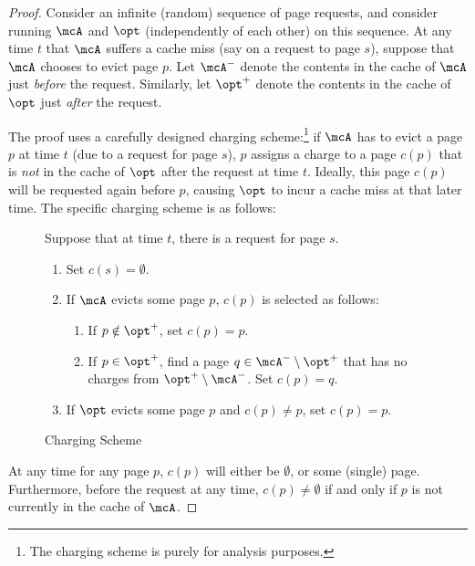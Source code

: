 \begin{proof}
    Consider an infinite (random) sequence of page requests, and consider running $\mcA$ and $\opt$ (independently of each other) on this sequence. At any time $t$ that $\mcA$ suffers a cache miss (say on a request to page $s$), suppose that $\mcA$ chooses to evict page $p$. Let $\mcA^-$ denote the contents in the cache of $\mcA$ just \textit{before} the request. Similarly, let $\opt^+$ denote the contents in the cache of $\opt$ just \textit{after} the request.
    
The proof uses a carefully designed charging scheme:\footnote{The charging scheme is purely for analysis purposes.} if $\mcA$ has to evict a page $p$ at time $t$ (due to a request for page $s$), $p$ assigns a charge to a page $c(p)$ that is \textit{not} in the cache of $\opt$ after the request at time $t$. Ideally, this page $c(p)$ will be requested again before $p$, causing $\opt$ to incur a cache miss at that later time. The specific charging scheme is as follows:
    \begin{figure}[H]
        \begin{framed}
        Suppose that at time $t$, there is a request for page $s$.
            \vspace{-2mm}
                \begin{enumerate}
                    \item \label{item:clear-charges} Set $c(s)=\emptyset$.
                    \item \label{item:assign-charge} If $\mcA$ evicts some page $p$, $c(p)$ is selected as follows:
                    \begin{enumerate}
                        \item \label{item:p-not-in-opt+} If $p \notin \opt^+$, set $c(p)=p$.
                        \item \label{item:p-in-opt+} If $p \in \opt^+$, find a page $q \in \mcA^- \setminus \opt^+$ that has no charges from $\opt^+ \setminus \mcA^-$. Set $c(p)=q$.\footnotemark
                    \end{enumerate}
                    \item \label{item:opt-eviction-charge-reassign} If $\opt$ evicts some page $p$ and $c(p) \neq p$, set $c(p)=p$.
                \end{enumerate}
            \vspace{-2mm}
        \end{framed}
        \vspace{-4mm}
        \caption{Charging Scheme}
        \label{fig:charging-scheme}
    \end{figure}
    At any time for any page $p$, $c(p)$ will either be $\emptyset$, or some (single) page. Furthermore, before the request at any time, $c(p) \neq \emptyset$ if and only if $p$ is not currently in the cache of $\mcA$.
    

\end{proof}
